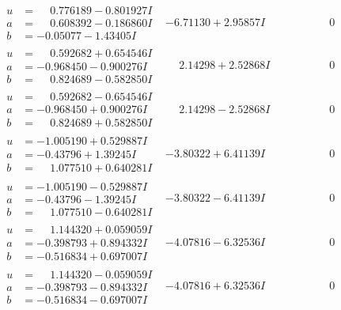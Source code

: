 \documentclass[1p]{elsarticle_modified}
\theoremstyle{definition}
\begin{document}
$$\begin{array}{c|c|c}
\begin{aligned}
u &= \phantom{-}0.776189 - 0.801927 I \\
a &= \phantom{-}0.608392 - 0.186860 I \\
b &= -0.05077 - 1.43405 I\end{aligned}
 & -6.71130 + 2.95857 I & \phantom{-0.000000 } 0 \\ \hline\begin{aligned}
u &= \phantom{-}0.592682 + 0.654546 I \\
a &= -0.968450 - 0.900276 I \\
b &= \phantom{-}0.824689 - 0.582850 I\end{aligned}
 & \phantom{-}2.14298 + 2.52868 I & \phantom{-0.000000 } 0 \\ \hline\begin{aligned}
u &= \phantom{-}0.592682 - 0.654546 I \\
a &= -0.968450 + 0.900276 I \\
b &= \phantom{-}0.824689 + 0.582850 I\end{aligned}
 & \phantom{-}2.14298 - 2.52868 I & \phantom{-0.000000 } 0 \\ \hline\begin{aligned}
u &= -1.005190 + 0.529887 I \\
a &= -0.43796 + 1.39245 I \\
b &= \phantom{-}1.077510 + 0.640281 I\end{aligned}
 & -3.80322 + 6.41139 I & \phantom{-0.000000 } 0 \\ \hline\begin{aligned}
u &= -1.005190 - 0.529887 I \\
a &= -0.43796 - 1.39245 I \\
b &= \phantom{-}1.077510 - 0.640281 I\end{aligned}
 & -3.80322 - 6.41139 I & \phantom{-0.000000 } 0 \\ \hline\begin{aligned}
u &= \phantom{-}1.144320 + 0.059059 I \\
a &= -0.398793 + 0.894332 I \\
b &= -0.516834 + 0.697007 I\end{aligned}
 & -4.07816 - 6.32536 I & \phantom{-0.000000 } 0 \\ \hline\begin{aligned}
u &= \phantom{-}1.144320 - 0.059059 I \\
a &= -0.398793 - 0.894332 I \\
b &= -0.516834 - 0.697007 I\end{aligned}
 & -4.07816 + 6.32536 I & \phantom{-0.000000 } 0 \\ \hline\begin{aligned}

\end{aligned}
\end{array}$$
\end{document}
